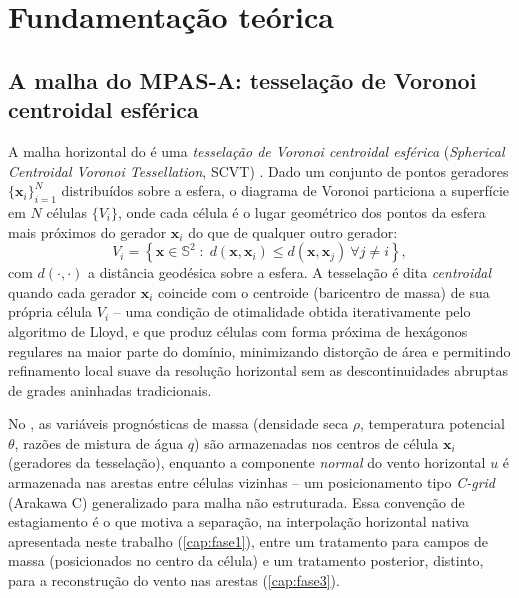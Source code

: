 \chapter{Fundamentação teórica}
\label{cap:fundamentacao}

\section{A malha do MPAS-A: tesselação de Voronoi centroidal esférica}

A malha horizontal do \mpasa{} é uma \emph{tesselação de Voronoi
centroidal esférica} (\textit{Spherical Centroidal Voronoi Tessellation},
SCVT) \cite{skamarock2012voronoi, dugunzburger2002cvt, yang2017cvtsphere}.
Dado um conjunto de pontos geradores $\{\mathbf{x}_i\}_{i=1}^{N}$
distribuídos sobre a esfera, o diagrama de Voronoi particiona a
superfície em $N$ células $\{V_i\}$, onde cada célula é o lugar
geométrico dos pontos da esfera mais próximos do gerador $\mathbf{x}_i$
do que de qualquer outro gerador:
\begin{equation}
  V_i = \left\{ \mathbf{x} \in \mathbb{S}^2 \;:\; d(\mathbf{x}, \mathbf{x}_i) \le d(\mathbf{x}, \mathbf{x}_j) \ \forall j \ne i \right\},
  \label{eq:voronoi_def}
\end{equation}
com $d(\cdot,\cdot)$ a distância geodésica sobre a esfera. A tesselação é
dita \emph{centroidal} quando cada gerador $\mathbf{x}_i$ coincide com o
centroide (baricentro de massa) de sua própria célula $V_i$ -- uma
condição de otimalidade obtida iterativamente pelo algoritmo de Lloyd, e
que produz células com forma próxima de hexágonos regulares na maior
parte do domínio, minimizando distorção de área e permitindo refinamento
local suave da resolução horizontal sem as descontinuidades abruptas de
grades aninhadas tradicionais.

No \mpasa{}, as variáveis prognósticas de massa (densidade seca $\rho$,
temperatura potencial $\theta$, razões de mistura de água $q$) são
armazenadas nos centros de célula $\mathbf{x}_i$ (geradores da
tesselação), enquanto a componente \emph{normal} do vento horizontal $u$
é armazenada nas arestas entre células vizinhas -- um posicionamento tipo
\emph{C-grid} (Arakawa C) generalizado para malha não estruturada. Essa
convenção de estagiamento é o que motiva a separação, na interpolação
horizontal nativa apresentada neste trabalho (\cref{cap:fase1}), entre um
tratamento para campos de massa (posicionados no centro da célula) e um
tratamento posterior, distinto, para a reconstrução do vento nas arestas
(\cref{cap:fase3}).

